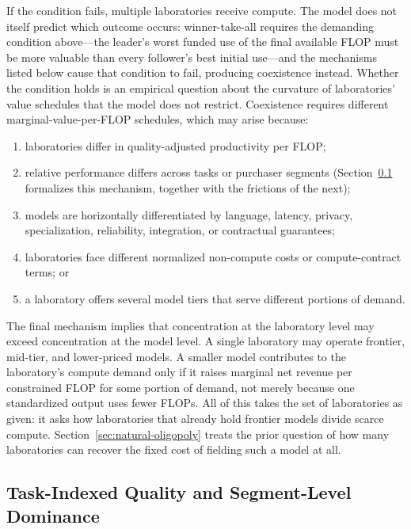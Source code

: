 \documentclass[11pt]{article}
\begin{document}
If the condition fails, multiple laboratories receive compute. The model does not itself predict which outcome occurs: winner-take-all requires the demanding condition above---the leader's worst funded use of the final available FLOP must be more valuable than every follower's best initial use---and the mechanisms listed below cause that condition to fail, producing coexistence instead. Whether the condition holds is an empirical question about the curvature of laboratories' value schedules that the model does not restrict. Coexistence requires different marginal-value-per-FLOP schedules, which may arise because:

\begin{enumerate}
\item laboratories differ in quality-adjusted productivity per FLOP;
\item relative performance differs across tasks or purchaser segments (Section~\ref{subsec:task-segmentation} formalizes this mechanism, together with the frictions of the next);
\item models are horizontally differentiated by language, latency, privacy, specialization, reliability, integration, or contractual guarantees;
\item laboratories face different normalized non-compute costs or compute-contract terms; or
\item a laboratory offers several model tiers that serve different portions of demand.
\end{enumerate}

The final mechanism implies that concentration at the laboratory level may exceed concentration at the model level. A single laboratory may operate frontier, mid-tier, and lower-priced models. A smaller model contributes to the laboratory's compute demand only if it raises marginal net revenue per constrained FLOP for some portion of demand, not merely because one standardized output uses fewer FLOPs. All of this takes the set of laboratories as given: it asks how laboratories that already hold frontier models divide scarce compute. Section~\ref{sec:natural-oligopoly} treats the prior question of how many laboratories can recover the fixed cost of fielding such a model at all.

\subsection{Task-Indexed Quality and Segment-Level Dominance}
\label{subsec:task-segmentation}
\end{document}
